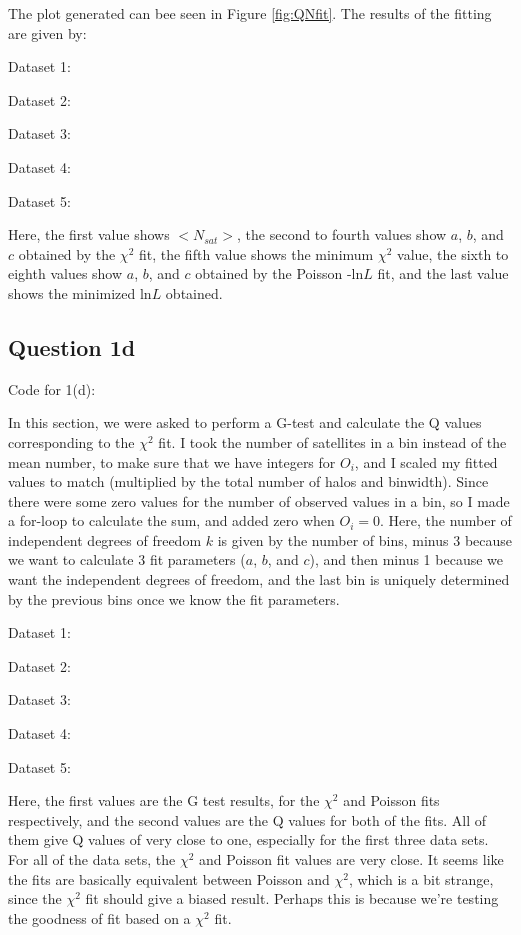 The plot generated can bee seen in Figure \ref{fig:QNfit}.
The results of the fitting are given by:

Dataset 1:

Dataset 2:

Dataset 3:

Dataset 4:

Dataset 5:


Here, the first value shows $<N_{sat}>$, the second to fourth values show $a$, $b$, and $c$ obtained by the $\chi^2$ fit, the fifth value shows the minimum $\chi^2$ value, the sixth to eighth values show $a$, $b$, and $c$ obtained by the Poisson -ln$L$ fit, and the last value shows the minimized ln$L$ obtained.


\subsection{Question 1d}

Code for 1(d):


In this section, we were asked to perform a G-test and calculate the Q values corresponding to the $\chi^2$ fit. 
I took the number of satellites in a bin instead of the mean number, to make sure that we have integers for $O_i$, and I scaled my fitted values to match (multiplied by the total number of halos and binwidth).
Since there were some zero values for the number of observed values in a bin, so I made a for-loop to calculate the sum, and added zero when $O_i = 0$.
Here, the number of independent degrees of freedom $k$ is given by the number of bins, minus 3 because we want to calculate 3 fit parameters ($a$, $b$, and $c$), and then minus 1 because we want the independent degrees of freedom, and the last bin is uniquely determined by the previous bins once we know the fit parameters.

Dataset 1:

Dataset 2:

Dataset 3:

Dataset 4:

Dataset 5:


Here, the first values are the G test results, for the $\chi^2$ and Poisson fits respectively, and the second values are the Q values for both of the fits.
All of them give Q values of very close to one, especially for the first three data sets. 
For all of the data sets, the $\chi^2$ and Poisson fit values are very close.
It seems like the fits are basically equivalent between Poisson and $\chi^2$, which is a bit strange, since the $\chi^2$ fit should give a biased result. 
Perhaps this is because we're testing the goodness of fit based on a $\chi^2$ fit.

